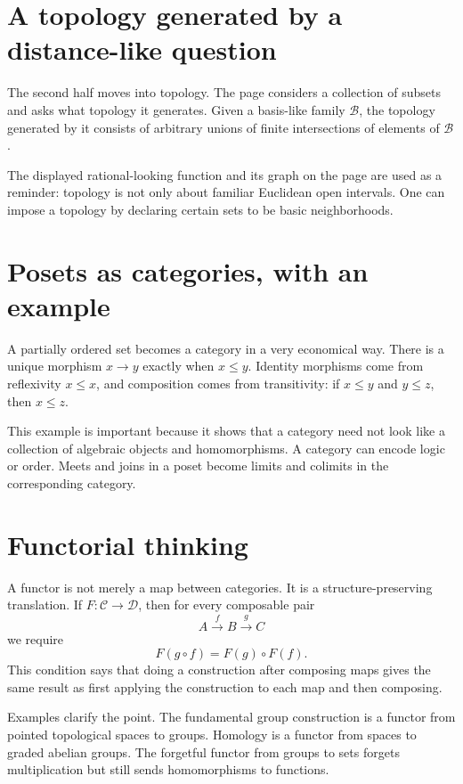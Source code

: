 \section{A topology generated by a distance-like question}

The second half moves into topology.  The page considers a collection of subsets and asks what topology it generates.  Given a basis-like family \(\mathcal B\), the topology generated by it consists of arbitrary unions of finite intersections of elements of \(\mathcal B\).

The displayed rational-looking function and its graph on the page are used as a reminder: topology is not only about familiar Euclidean open intervals.  One can impose a topology by declaring certain sets to be basic neighborhoods.


\section{Posets as categories, with an example}

A partially ordered set becomes a category in a very economical way.  There is a unique morphism \(x\to y\) exactly when \(x\le y\).  Identity morphisms come from reflexivity \(x\le x\), and composition comes from transitivity: if \(x\le y\) and \(y\le z\), then \(x\le z\).

This example is important because it shows that a category need not look like a collection of algebraic objects and homomorphisms.  A category can encode logic or order.  Meets and joins in a poset become limits and colimits in the corresponding category.

\section{Functorial thinking}

A functor is not merely a map between categories.  It is a structure-preserving translation.  If \(F:\mathcal C\to\mathcal D\), then for every composable pair
\[
  A\xrightarrow{f}B\xrightarrow{g}C
\]
we require
\[
  F(g\circ f)=F(g)\circ F(f).
\]
This condition says that doing a construction after composing maps gives the same result as first applying the construction to each map and then composing.

Examples clarify the point.  The fundamental group construction is a functor from pointed topological spaces to groups.  Homology is a functor from spaces to graded abelian groups.  The forgetful functor from groups to sets forgets multiplication but still sends homomorphisms to functions.

